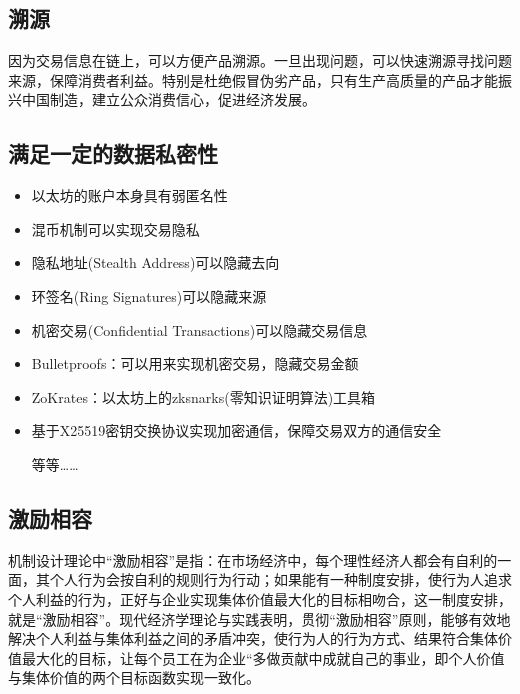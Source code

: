 \documentclass[UTF9]{ctexart}
\begin{document}
\subsection{溯源}

因为交易信息在链上，可以方便产品溯源。一旦出现问题，可以快速溯源寻找问题来源，保障消费者利益。特别是杜绝假冒伪劣产品，只有生产高质量的产品才能振兴中国制造，建立公众消费信心，促进经济发展。

\subsection{满足一定的数据私密性}

\begin{itemize}
\item 以太坊的账户本身具有弱匿名性
\item 混币机制可以实现交易隐私
\item 隐私地址(Stealth Address)可以隐藏去向
\item 环签名(Ring Signatures)可以隐藏来源
\item 机密交易(Confidential Transactions)可以隐藏交易信息
\item Bulletproofs：可以用来实现机密交易，隐藏交易金额
\item ZoKrates：以太坊上的zksnarks(零知识证明算法)工具箱
\item 基于X25519密钥交换协议实现加密通信，保障交易双方的通信安全

等等……
\end{itemize}

\subsection{激励相容}

机制设计理论中“激励相容”是指：在市场经济中，每个理性经济人都会有自利的一面，其个人行为会按自利的规则行为行动；如果能有一种制度安排，使行为人追求个人利益的行为，正好与企业实现集体价值最大化的目标相吻合，这一制度安排，就是“激励相容”。现代经济学理论与实践表明，贯彻“激励相容”原则，能够有效地解决个人利益与集体利益之间的矛盾冲突，使行为人的行为方式、结果符合集体价值最大化的目标，让每个员工在为企业“多做贡献中成就自己的事业，即个人价值与集体价值的两个目标函数实现一致化。
\end{document}
